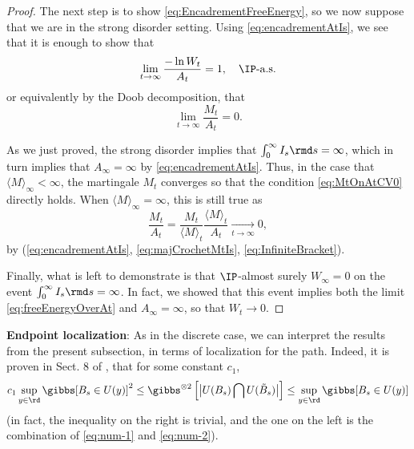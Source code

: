 \begin{proof}
The next step is to show \eqref{eq:EncadrementFreeEnergy}, so we now suppose that we are in the strong disorder setting.
Using \eqref{eq:encadrementAtIs}, we see that it is enough to show that
\begin{equation} \label{eq:freeEnergyOverAt}
\lim_{t\to\infty} \frac{- \ln W_t}{A_t} = 1, \quad \IP\text{-a.s.}
\end{equation}
or equivalently by the Doob decomposition, that 
\begin{equation}\label{eq:MtOnAtCV0}
\lim_{t \to \infty} \frac{M_t}{A_t} = 0.
\end{equation}

As we just proved, the strong disorder implies that $\int_0^\infty I_s \rmd s = \infty$, which in turn implies that  $A_\infty = \infty$ by \eqref{eq:encadrementAtIs}. Thus, in the case that $\langle M \rangle_\infty < \infty$, the martingale $M_t$ converges so that the condition \eqref{eq:MtOnAtCV0} directly holds. When $\langle M \rangle_\infty = \infty$, this is still true as
\[\frac{M_t}{A_t}=\frac{M_t}{\langle M \rangle_t} \frac{\langle M \rangle_t}{A_t} \underset{t\to\infty}{\longrightarrow} 0,\]
by (\ref{eq:encadrementAtIs}, \ref{eq:majCrochetMtIs},  \ref{eq:InfiniteBracket}).

Finally, what is left to demonstrate is that $\IP$-almost surely   $W_\infty = 0$ 
on the event $\int_0^\infty I_s \rmd s=\infty$. In fact, we showed that this event implies both the limit \eqref{eq:freeEnergyOverAt} and $A_\infty = \infty$, so that $W_t \to 0$.
\end{proof}

{\bf Endpoint localization}: 
As in the discrete case, we can interpret the results from the present subsection, in terms
of localization for the path. Indeed, it is proven in Sect. 8 of \cite{CY05}, that for some constant $c_1$, 
\begin{equation} \label{eq:overlap-favorite}
c_1 \sup_{y \in \rd} \gibbs [ B_s \in U(y)]^2 \leq { \gibbs}^{\otimes 2} \left[ \big \vert U(B_s) \bigcap U(\tilde B_s)\big \vert \right]
\leq \sup_{y \in \rd} \gibbs [ B_s \in U(y)]
\end{equation}
(in fact, the inequality on the right is trivial, and the one on the left is the combination of \eqref{eq:num-1} and \eqref{eq:num-2}).


